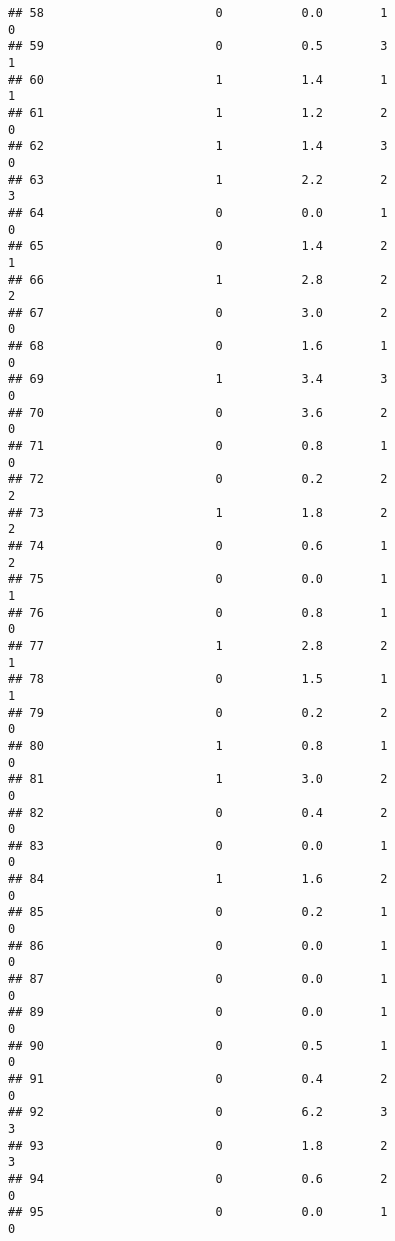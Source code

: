 \documentclass[]{article}
\begin{document}
\begin{verbatim}
## 58                        0           0.0        1                 0
## 59                        0           0.5        3                 1
## 60                        1           1.4        1                 1
## 61                        1           1.2        2                 0
## 62                        1           1.4        3                 0
## 63                        1           2.2        2                 3
## 64                        0           0.0        1                 0
## 65                        0           1.4        2                 1
## 66                        1           2.8        2                 2
## 67                        0           3.0        2                 0
## 68                        0           1.6        1                 0
## 69                        1           3.4        3                 0
## 70                        0           3.6        2                 0
## 71                        0           0.8        1                 0
## 72                        0           0.2        2                 2
## 73                        1           1.8        2                 2
## 74                        0           0.6        1                 2
## 75                        0           0.0        1                 1
## 76                        0           0.8        1                 0
## 77                        1           2.8        2                 1
## 78                        0           1.5        1                 1
## 79                        0           0.2        2                 0
## 80                        1           0.8        1                 0
## 81                        1           3.0        2                 0
## 82                        0           0.4        2                 0
## 83                        0           0.0        1                 0
## 84                        1           1.6        2                 0
## 85                        0           0.2        1                 0
## 86                        0           0.0        1                 0
## 87                        0           0.0        1                 0
## 89                        0           0.0        1                 0
## 90                        0           0.5        1                 0
## 91                        0           0.4        2                 0
## 92                        0           6.2        3                 3
## 93                        0           1.8        2                 3
## 94                        0           0.6        2                 0
## 95                        0           0.0        1                 0

\end{verbatim}
\end{document}
